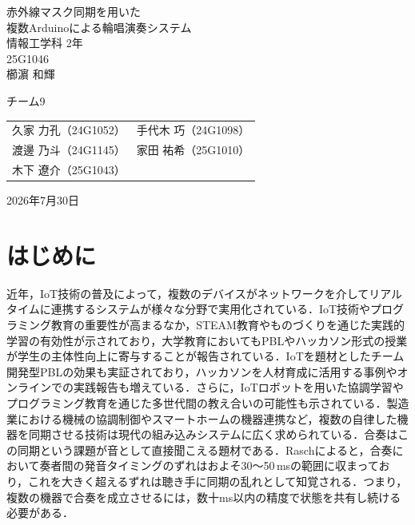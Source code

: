\documentclass[uplatex,dvipdfmx]{jlreq}
\begin{document}
\begin{titlepage}
\vspace*{1cm}
\centering
\Huge\textsf{赤外線マスク同期を用いた\\複数Arduinoによる輪唱演奏システム}\\[2cm]
\Large\textsf{情報工学科 2年}\\
\Large\textsf{25G1046}\\[5pt]
\huge\textsf{櫛濵 和輝}

\vspace*{1cm}
\Large\sffamily
\begin{itembox}[c]{チーム9}
\centering
\begin{tabular}{ll}
久家 力孔（24G1052）&
手代木 巧（24G1098）\\
渡邊 乃斗（24G1145）&
家田 祐希（25G1010）\\
木下 遼介（25G1043）&\\
\end{tabular}
\end{itembox}

\vspace*{1cm}
\Large\textsf{2026年7月30日}
\end{titlepage}
\clearpage

\section{はじめに}

近年，IoT技術の普及によって，複数のデバイスがネットワークを介してリアルタイムに連携するシステムが様々な分野で実用化されている\cite{sakamura2017}．IoT技術やプログラミング教育の重要性が高まるなか\cite{mitsui2018}，STEAM教育やものづくりを通じた実践的学習の有効性が示されており\cite{yamazaki2020,mori2022}，大学教育においてもPBLやハッカソン形式の授業が学生の主体性向上に寄与することが報告されている\cite{kido2015,yoshikawa2021,omata2020}．IoTを題材としたチーム開発型PBLの効果も実証されており\cite{igaki2018}，ハッカソンを人材育成に活用する事例\cite{hashimoto2019}やオンラインでの実践報告\cite{matsumoto2022}も増えている．さらに，IoTロボットを用いた協調学習\cite{noguchi2020}やプログラミング教育を通じた多世代間の教え合いの可能性\cite{kusaka2020}も示されている．製造業における機械の協調制御やスマートホームの機器連携など，複数の自律した機器を同期させる技術は現代の組み込みシステムに広く求められている．合奏はこの同期という課題が音として直接聞こえる題材である．Raschによると，合奏において奏者間の発音タイミングのずれはおよそ30〜50\,msの範囲に収まっており，これを大きく超えるずれは聴き手に同期の乱れとして知覚される\cite{rasch}．つまり，複数の機器で合奏を成立させるには，数十ms以内の精度で状態を共有し続ける必要がある．
\end{document}
